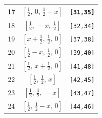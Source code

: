 \documentclass[fleqn,8pt]{jsarticle}
\begin{document}
\begin{longtable}{ccc}
17 & $\left[ \frac{1}{2},\, 0,\, \frac{1}{2} - x \right]$ & {\tt [31,35]} \\ \hline
18 & $\left[ \frac{1}{2},\, - x,\, \frac{1}{2} \right]$ & {\tt [32,34]} \\ \hline
19 & $\left[ x + \frac{1}{2},\, \frac{1}{2},\, 0 \right]$ & {\tt [37,38]} \\ \hline
20 & $\left[ \frac{1}{2} - x,\, \frac{1}{2},\, 0 \right]$ & {\tt [39,40]} \\ \hline
21 & $\left[ \frac{1}{2},\, x + \frac{1}{2},\, 0 \right]$ & {\tt [41,48]} \\ \hline
22 & $\left[ \frac{1}{2},\, \frac{1}{2},\, x \right]$ & {\tt [42,45]} \\ \hline
23 & $\left[ \frac{1}{2},\, \frac{1}{2},\, - x \right]$ & {\tt [43,47]} \\ \hline
24 & $\left[ \frac{1}{2},\, \frac{1}{2} - x,\, 0 \right]$ & {\tt [44,46]} \\
\end{longtable}
\renewcommand{\arraystretch}{1.2}
\end{document}

